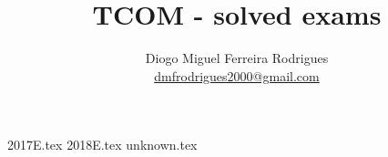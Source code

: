 \documentclass[a4paper]{article}
\title{TCOM - solved exams}
\author{Diogo Miguel Ferreira Rodrigues \\ \href{mailto:dmfrodrigues2000@gmail.com}{dmfrodrigues2000@gmail.com}}
\date{}
\begin{document}
\begingroup
	\maketitle
	\let\clearpage\relax
	\setcounter{tocdepth}{2}
	\tableofcontents
\endgroup
{2017E.tex}
{2018E.tex}
{unknown.tex}
\end{document}
